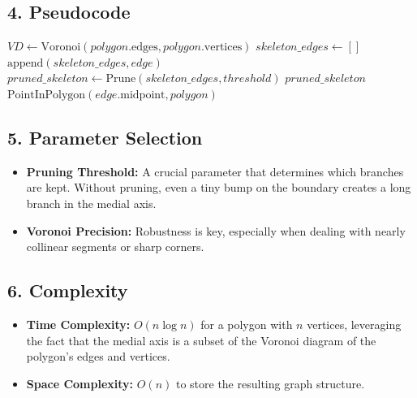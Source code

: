 \subsection{4. Pseudocode}

\begin{algorithm}
\caption{Medial Axis}
\label{alg:medial_axis}
\begin{algorithmic}[1]
    \State $VD \gets \text{Voronoi}(polygon.\text{edges}, polygon.\text{vertices})$
    \State $skeleton\_edges \gets []$
            \State $\text{append}(skeleton\_edges, edge)$
        \EndIf
    \EndFor
    \State $pruned\_skeleton \gets \text{Prune}(skeleton\_edges, threshold)$
    \State \Return $pruned\_skeleton$
\EndFunction
\\
    \State \Return $\text{PointInPolygon}(edge.\text{midpoint}, polygon)$
\EndFunction
\end{algorithmic}
\end{algorithm}

\subsection{5. Parameter Selection}

\begin{itemize}
    \item \textbf{Pruning Threshold:} A crucial parameter that determines which branches are kept. Without pruning, even a tiny bump on the boundary creates a long branch in the medial axis.
    \item \textbf{Voronoi Precision:} Robustness is key, especially when dealing with nearly collinear segments or sharp corners.
\end{itemize}

\subsection{6. Complexity}

\begin{itemize}
    \item \textbf{Time Complexity:} $O(n \log n)$ for a polygon with $n$ vertices, leveraging the fact that the medial axis is a subset of the Voronoi diagram of the polygon's edges and vertices.
    \item \textbf{Space Complexity:} $O(n)$ to store the resulting graph structure.
\end{itemize}

